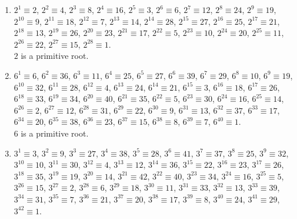 {\begin{enumerate}
\begin{enumerate}[label=(\roman*)]
                        \(5\) is a primitive root.
                  \item \(2^1 \equiv 2\), \(2^{2} \equiv 4\), \(2^{3} \equiv 8\), \(2^{4} \equiv 16\), \(2^{5} \equiv 3\), \(2^{6} \equiv 6\), \(2^{7} \equiv 12\), \(2^{8} \equiv 24\), \(2^{9} \equiv 19\), \(2^{10} \equiv 9\), \(2^{11} \equiv 18\), \(2^{12} \equiv 7\), \(2^{13} \equiv 14\), \(2^{14} \equiv 28\), \(2^{15} \equiv 27\), \(2^{16} \equiv 25\), \(2^{17} \equiv 21\), \(2^{18} \equiv 13\), \(2^{19} \equiv 26\), \(2^{20} \equiv 23\), \(2^{21} \equiv 17\), \(2^{22} \equiv 5\), \(2^{23} \equiv 10\), \(2^{24} \equiv 20\), \(2^{25} \equiv 11\), \(2^{26} \equiv 22\), \(2^{27} \equiv 15\),
                        \(2^{28} \equiv 1\). \\

                        \(2\) is a primitive root.
                  \item \(6^{1} \equiv 6\), \(6^{2} \equiv 36\), \(6^{3} \equiv 11\), \(6^{4} \equiv 25\), \(6^{5} \equiv 27\), \(6^{6} \equiv 39\), \(6^{7} \equiv 29\), \(6^{8} \equiv 10\), \(6^{9} \equiv 19\), \(6^{10} \equiv 32\), \(6^{11} \equiv 28\), \(6^{12} \equiv 4\), \(6^{13} \equiv 24\), \(6^{14} \equiv 21\), \(6^{15} \equiv 3\), \(6^{16} \equiv 18\), \(6^{17} \equiv 26\), \(6^{18} \equiv 33\), \(6^{19} \equiv 34\), \(6^{20} \equiv 40\), \(6^{21} \equiv 35\), \(6^{22} \equiv 5\), \(6^{23} \equiv 30\), \(6^{24} \equiv 16\), \(6^{25} \equiv 14\), \(6^{26} \equiv 2\), \(6^{27} \equiv 12\), \(6^{28} \equiv 31\), \(6^{29} \equiv 22\), \(6^{30} \equiv 9\), \(6^{31} \equiv 13\), \(6^{32} \equiv 37\), \(6^{33} \equiv 17\), \(6^{34} \equiv 20\), \(6^{35} \equiv 38\), \(6^{36} \equiv 23\), \(6^{37} \equiv 15\), \(6^{38} \equiv 8\), \(6^{39} \equiv 7\), \(6^{40} \equiv 1\).\\

                        \(6\) is a primitive root.
                  \item \(3^{1} \equiv 3\), \(3^{2} \equiv 9\), \(3^{3} \equiv 27\), \(3^{4} \equiv 38\), \(3^{5} \equiv 28\), \(3^{6} \equiv 41\), \(3^{7} \equiv 37\), \(3^{8} \equiv 25\), \(3^{9} \equiv 32\), \(3^{10} \equiv 10\), \(3^{11} \equiv 30\), \(3^{12} \equiv 4\), \(3^{13} \equiv 12\), \(3^{14} \equiv 36\), \(3^{15} \equiv 22\), \(3^{16} \equiv 23\), \(3^{17} \equiv 26\), \(3^{18} \equiv 35\), \(3^{19} \equiv 19\), \(3^{20} \equiv 14\), \(3^{21} \equiv 42\), \(3^{22} \equiv 40\), \(3^{23} \equiv 34\), \(3^{24} \equiv 16\), \(3^{25} \equiv 5\), \(3^{26} \equiv 15\), \(3^{27} \equiv 2\), \(3^{28} \equiv 6\), \(3^{29} \equiv 18\), \(3^{30} \equiv 11\), \(3^{31} \equiv 33\), \(3^{32} \equiv 13\), \(3^{33} \equiv 39\), \(3^{34} \equiv 31\), \(3^{35} \equiv 7\), \(3^{36} \equiv 21\), \(3^{37} \equiv 20\), \(3^{38} \equiv 17\), \(3^{39} \equiv 8\), \(3^{40} \equiv 24\), \(3^{41} \equiv 29\),
                        \(3^{42} \equiv 1\). \\


\end{enumerate}
\end{enumerate}}
